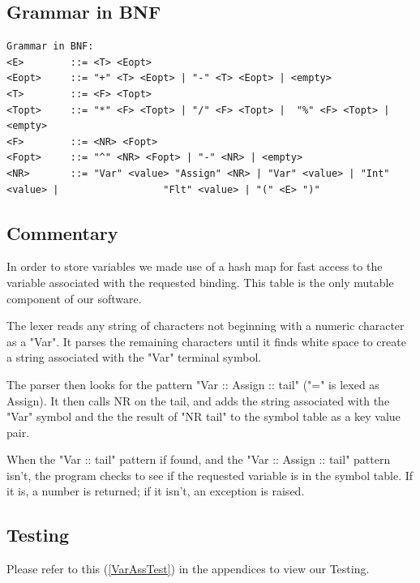 \documentclass[a4paper, oneside, 11pt]{report}
\begin{document}
\subsection{Grammar in BNF}
\begin{verbatim}
Grammar in BNF:
<E>        ::= <T> <Eopt>
<Eopt>     ::= "+" <T> <Eopt> | "-" <T> <Eopt> | <empty>
<T>        ::= <F> <Topt>
<Topt>     ::= "*" <F> <Topt> | "/" <F> <Topt> |  "%" <F> <Topt> |<empty>
<F>        ::= <NR> <Fopt>
<Fopt>     ::= "^" <NR> <Fopt> | "-" <NR> | <empty> 
<NR>       ::= "Var" <value> "Assign" <NR> | "Var" <value> | "Int" <value> |                  "Flt" <value> | "(" <E> ")"

\end{verbatim}

\subsection{Commentary}
In order to store variables we made use of a hash map for fast access to the variable associated with the requested binding. This table is the only mutable component of our software.

The lexer reads any string of characters not beginning with a numeric character as a "Var". It parses the remaining characters until it finds white space to create a string associated with the "Var" terminal symbol. 

The parser then looks for the pattern "Var :: Assign :: tail" ("=" is lexed as Assign). It then calls NR on the tail, and adds the string associated with the "Var" symbol and the the result of "NR tail" to the symbol table as a key value pair.

When the "Var :: tail" pattern if found, and the "Var :: Assign :: tail" pattern isn't, the program checks to see if the requested variable is in the symbol table. If it is, a number is returned; if it isn't, an exception is raised. 

\subsection{Testing}
Please refer to this (\ref{VarAssTest}) in the appendices to view our Testing. \\


\clearpage
\end{document}
